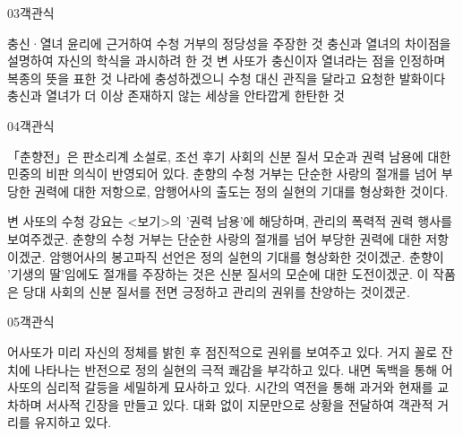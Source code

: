 \documentclass[fs85,seriesWit]{korfarm-base}
\begin{document}
\begin{kfQBlock}{03}{객관식}
\begin{kfChoices}
\kfChoice 충신·열녀 윤리에 근거하여 수청 거부의 정당성을 주장한 것
\kfChoice 충신과 열녀의 차이점을 설명하여 자신의 학식을 과시하려 한 것
\kfChoice 변 사또가 충신이자 열녀라는 점을 인정하며 복종의 뜻을 표한 것
\kfChoice 나라에 충성하겠으니 수청 대신 관직을 달라고 요청한 발화이다
\kfChoice 충신과 열녀가 더 이상 존재하지 않는 세상을 안타깝게 한탄한 것
\end{kfChoices}
\end{kfQBlock}

\begin{kfQBlock}{04}{객관식}
\begin{kfEvidence}「춘향전」은 판소리계 소설로, 조선 후기 사회의 신분 질서 모순과 권력 남용에 대한 민중의 비판 의식이 반영되어 있다. 춘향의 수청 거부는 단순한 사랑의 절개를 넘어 부당한 권력에 대한 저항으로, 암행어사의 출도는 정의 실현의 기대를 형상화한 것이다.\end{kfEvidence}
\begin{kfChoices}
\kfChoice 변 사또의 수청 강요는 <보기>의 '권력 남용'에 해당하며, 관리의 폭력적 권력 행사를 보여주겠군.
\kfChoice 춘향의 수청 거부는 단순한 사랑의 절개를 넘어 부당한 권력에 대한 저항이겠군.
\kfChoice 암행어사의 봉고파직 선언은 정의 실현의 기대를 형상화한 것이겠군.
\kfChoice 춘향이 '기생의 딸'임에도 절개를 주장하는 것은 신분 질서의 모순에 대한 도전이겠군.
\kfChoice 이 작품은 당대 사회의 신분 질서를 전면 긍정하고 관리의 권위를 찬양하는 것이겠군.
\end{kfChoices}
\end{kfQBlock}

\begin{kfQBlock}{05}{객관식}
\begin{kfChoices}
\kfChoice 어사또가 미리 자신의 정체를 밝힌 후 점진적으로 권위를 보여주고 있다.
\kfChoice 거지 꼴로 잔치에 나타나는 반전으로 정의 실현의 극적 쾌감을 부각하고 있다.
\kfChoice 내면 독백을 통해 어사또의 심리적 갈등을 세밀하게 묘사하고 있다.
\kfChoice 시간의 역전을 통해 과거와 현재를 교차하며 서사적 긴장을 만들고 있다.
\kfChoice 대화 없이 지문만으로 상황을 전달하여 객관적 거리를 유지하고 있다.
\end{kfChoices}
\end{kfQBlock}
\end{document}
